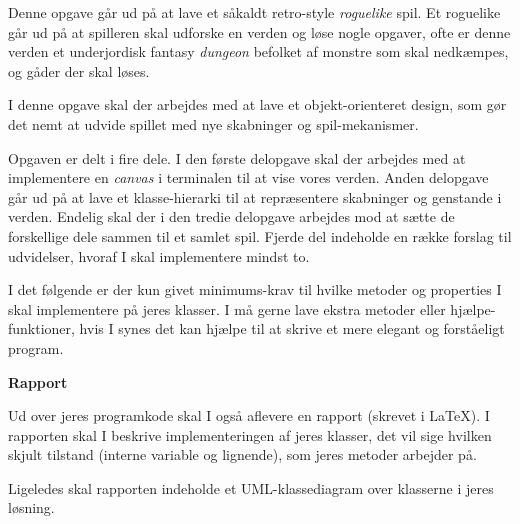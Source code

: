 
Denne opgave går ud på at lave et såkaldt retro-style \emph{roguelike}
spil. Et roguelike går ud på at spilleren skal udforske en verden og løse
nogle opgaver, ofte er denne verden et underjordisk fantasy
\emph{dungeon} befolket af monstre som skal nedkæmpes, og gåder der
skal løses.

I denne opgave skal der arbejdes med at lave et objekt-orienteret
design, som gør det nemt at udvide spillet med nye skabninger og
spil-mekanismer.

Opgaven er delt i fire dele. I den første delopgave skal der arbejdes
med at implementere en \emph{canvas} i terminalen til at vise vores
verden. Anden delopgave går ud på at lave et klasse-hierarki til at
repræsentere skabninger og genstande i verden. Endelig skal der i den
tredie delopgave arbejdes mod at sætte de forskellige dele sammen til
et samlet spil. Fjerde del indeholde en række forslag til udvidelser,
hvoraf I skal implementere mindst to.

I det følgende er der kun givet minimums-krav til hvilke metoder og
properties I skal implementere på jeres klasser. I må gerne lave
ekstra metoder eller hjælpe-funktioner, hvis I synes det kan hjælpe
til at skrive et mere elegant og forståeligt program.

\textbf{Rapport}

Ud over jeres programkode skal I også aflevere en rapport (skrevet i
\LaTeX). I rapporten skal I beskrive implementeringen af jeres
klasser, det vil sige hvilken skjult tilstand (interne variable og
lignende), som jeres metoder arbejder på.

Ligeledes skal rapporten indeholde et UML-klassediagram over klasserne i
jeres løsning.


